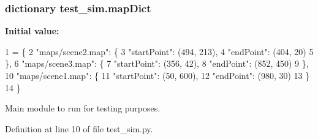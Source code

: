 \hypertarget{namespacetest__sim_a7550c4b395516fd2fa13ebfd927c9908}{
\subsubsection[{map\-Dict}]{\setlength{\rightskip}{0pt plus 5cm}dictionary test\-\_\-sim.\-map\-Dict}}\label{namespacetest__sim_a7550c4b395516fd2fa13ebfd927c9908}
{\bfseries Initial value\-:}
\begin{DoxyCode}
1 = \{
2         \textcolor{stringliteral}{"maps/scene2.map"}: \{
3             \textcolor{stringliteral}{"startPoint"}: (494, 213), 
4             \textcolor{stringliteral}{"endPoint"}: (404, 20)
5         \}, 
6         \textcolor{stringliteral}{"maps/scene3.map"}: \{
7             \textcolor{stringliteral}{"startPoint"}: (356, 42), 
8             \textcolor{stringliteral}{"endPoint"}: (852, 450)
9         \}, 
10         \textcolor{stringliteral}{"maps/scene1.map"}: \{
11             \textcolor{stringliteral}{"startPoint"}: (50, 600), 
12             \textcolor{stringliteral}{"endPoint"}: (980, 30)
13         \}
14     \}
\end{DoxyCode}


Main module to run for testing purposes. 



Definition at line 10 of file test\-\_\-sim.\-py.

